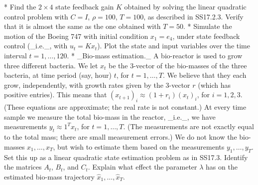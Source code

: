 * Find the \(2\times 4\) state feedback gain \(K\) obtained by solving the linear quadratic control problem with \(C=I\), \(\rho=100\), \(T=100\), as described in SS17.2.3. Verify that it is almost the same as the one obtained with \(T=50\).
* Simulate the motion of the Boeing 747 with initial condition \(x_{1}=e_{4}\), under state feedback control (_i.e._, with \(u_{t}=Kx_{t}\)). Plot the state and input variables over the time interval \(t=1,\ldots,120\).
* _Bio-mass estimation._ A bio-reactor is used to grow three different bacteria. We let \(x_{t}\) be the 3-vector of the bio-masses of the three bacteria, at time period (say, hour) \(t\), for \(t=1,\ldots,T\). We believe that they each grow, independently, with growth rates given by the 3-vector \(r\) (which has positive entries). This means that \((x_{t+1})_{i}\approx(1+r_{i})(x_{t})_{i}\), for \(i=1,2,3\). (These equations are approximate; the real rate is not constant.) At every time sample we measure the total bio-mass in the reactor, _i.e._, we have measurements \(y_{t}\approx 1^{T}x_{t}\), for \(t=1,\ldots,T\). (The measurements are not exactly equal to the total mass; there are small measurement errors.) We do not know the bio-masses \(x_{1},\ldots,x_{T}\), but wish to estimate them based on the measurements \(y_{1},\ldots,y_{T}\). Set this up as a linear quadratic state estimation problem as in SS17.3. Identify the matrices \(A_{t}\), \(B_{t}\), and \(C_{t}\). Explain what effect the parameter \(\lambda\) has on the estimated bio-mass trajectory \(\hat{x}_{1},\ldots,\hat{x}_{T}\).

 